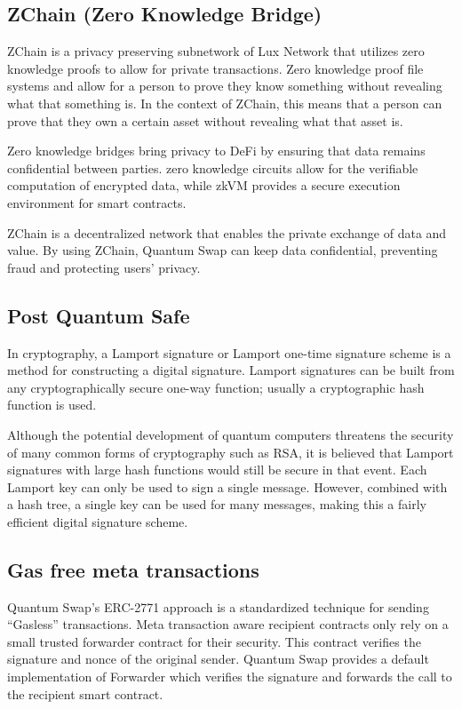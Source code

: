 \documentclass[11pt]{article}
\begin{document}
\subsection{ZChain (Zero Knowledge Bridge)}

ZChain is a privacy preserving subnetwork of Lux Network that utilizes zero knowledge proofs to allow for private transactions. Zero knowledge proof file systems and allow for a person to prove they know something without revealing what that something is. In the context of ZChain, this means that a person can prove that they own a certain asset without revealing what that asset is.


Zero knowledge bridges bring privacy to DeFi by ensuring that data remains confidential between parties. zero knowledge circuits allow for the verifiable computation of encrypted data, while zkVM provides a secure execution environment for smart contracts.


ZChain is a decentralized network that enables the private exchange of data and value. By using ZChain, Quantum Swap can keep data confidential, preventing fraud and protecting users' privacy.


\subsection{Post Quantum Safe}

In cryptography, a Lamport signature or Lamport one-time signature scheme is a method for constructing a digital signature. Lamport signatures can be built from any cryptographically secure one-way function; usually a cryptographic hash function is used.


Although the potential development of quantum computers threatens the security of many common forms of cryptography such as RSA, it is believed that Lamport signatures with large hash functions would still be secure in that event. Each Lamport key can only be used to sign a single message. However, combined with a hash tree, a single key can be used for many messages, making this a fairly efficient digital signature scheme.


\subsection{Gas free meta transactions}

Quantum Swap's ERC-2771 approach is a standardized technique for sending ``Gasless'' transactions. Meta transaction aware recipient contracts only rely on a small trusted forwarder contract for their security. This contract verifies the signature and nonce of the original sender. Quantum Swap provides a default implementation of Forwarder which verifies the signature and forwards the call to the recipient smart contract.
\end{document}
